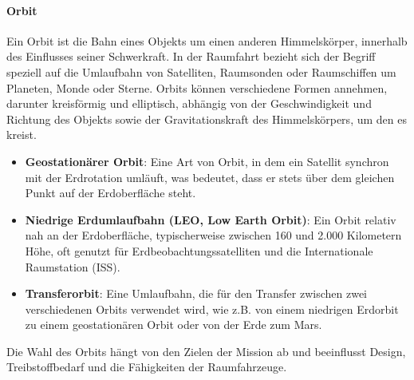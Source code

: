 \documentclass{vorlage-design-main}
\begin{document}
\hypertarget{orbit}{%
\paragraph{Orbit}\label{orbit}}

Ein Orbit ist die Bahn eines Objekts um einen anderen Himmelskörper,
innerhalb des Einflusses seiner Schwerkraft. In der Raumfahrt bezieht
sich der Begriff speziell auf die Umlaufbahn von Satelliten, Raumsonden
oder Raumschiffen um Planeten, Monde oder Sterne. Orbits können
verschiedene Formen annehmen, darunter kreisförmig und elliptisch,
abhängig von der Geschwindigkeit und Richtung des Objekts sowie der
Gravitationskraft des Himmelskörpers, um den es kreist.

\begin{itemize}

\item
  \textbf{Geostationärer Orbit}: Eine Art von Orbit, in dem ein Satellit
  synchron mit der Erdrotation umläuft, was bedeutet, dass er stets über
  dem gleichen Punkt auf der Erdoberfläche steht.
\item
  \textbf{Niedrige Erdumlaufbahn (LEO, Low Earth Orbit)}: Ein Orbit
  relativ nah an der Erdoberfläche, typischerweise zwischen 160 und
  2.000 Kilometern Höhe, oft genutzt für Erdbeobachtungssatelliten und
  die Internationale Raumstation (ISS).
\item
  \textbf{Transferorbit}: Eine Umlaufbahn, die für den Transfer zwischen
  zwei verschiedenen Orbits verwendet wird, wie z.B. von einem niedrigen
  Erdorbit zu einem geostationären Orbit oder von der Erde zum Mars.
\end{itemize}

Die Wahl des Orbits hängt von den Zielen der Mission ab und beeinflusst
Design, Treibstoffbedarf und die Fähigkeiten der
Raumfahrzeuge. %


\clearpage
\printbibliography
\end{document}
